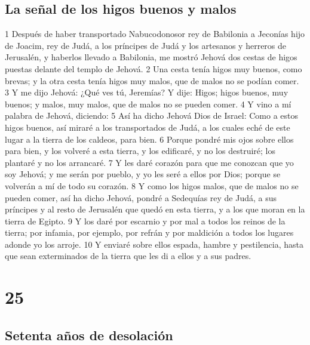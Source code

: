 \section*{La señal de los higos buenos y malos}

1 Después de haber transportado Nabucodonosor rey de Babilonia a Jeconías hijo de Joacim, rey de Judá, a los príncipes de Judá y los artesanos y herreros de Jerusalén, y haberlos llevado a Babilonia, me mostró Jehová dos cestas de higos puestas delante del templo de Jehová.
2 Una cesta tenía higos muy buenos, como brevas; y la otra cesta tenía higos muy malos, que de malos no se podían comer.
3 Y me dijo Jehová: ¿Qué ves tú, Jeremías? Y dije: Higos; higos buenos, muy buenos; y malos, muy malos, que de malos no se pueden comer.
4 Y vino a mí palabra de Jehová, diciendo:
5 Así ha dicho Jehová Dios de Israel: Como a estos higos buenos, así miraré a los transportados de Judá, a los cuales eché de este lugar a la tierra de los caldeos, para bien.
6 Porque pondré mis ojos sobre ellos para bien, y los volveré a esta tierra, y los edificaré, y no los destruiré; los plantaré y no los arrancaré.
7 Y les daré corazón para que me conozcan que yo soy Jehová; y me serán por pueblo, y yo les seré a ellos por Dios; porque se volverán a mí de todo su corazón.
8 Y como los higos malos, que de malos no se pueden comer, así ha dicho Jehová, pondré a Sedequías rey de Judá, a sus príncipes y al resto de Jerusalén que quedó en esta tierra, y a los que moran en la tierra de Egipto.
9 Y los daré por escarnio y por mal a todos los reinos de la tierra; por infamia, por ejemplo, por refrán y por maldición a todos los lugares adonde yo los arroje. 
10 Y enviaré sobre ellos espada, hambre y pestilencia, hasta que sean exterminados de la tierra que les di a ellos y a sus padres.

\chapter{25}

\section*{Setenta años de desolación}

